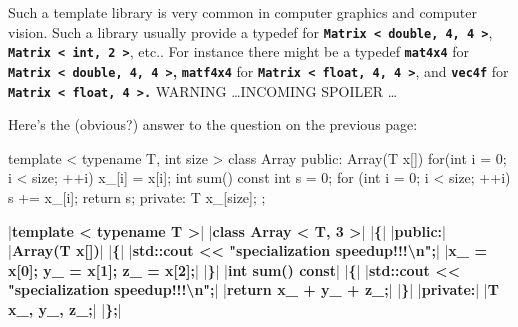 Such a template library is very common in computer graphics and computer
vision. Such a library usually provide a typedef for \texttt{\textbf{Matrix < double, 4, 4 >}}, \texttt{\textbf{Matrix < int, 2 >}}, etc.. For instance there might be a typedef \texttt{\textbf{mat4x4}} for \texttt{\textbf{Matrix < double, 4, 4 >}}\textbf{, }\texttt{\textbf{mat}\textbf{f}\textbf{4x4}} for \textbf{\texttt{Matrix < float, 4, 4 >}}, and \texttt{\textbf{vec4f}} for \texttt{\textbf{Matrix < float, 4 >.}}
\newpage %
WARNING \ldots INCOMING SPOILER \ldots

Here's the (obvious?) answer to the question on the previous page:

\begin{consolethree}[escapeinside=||]
template < typename T, int size >
class Array
{
public:
     Array(T x[])
     {    
          for(int i = 0; i  < size; ++i)
          x_[i] = x[i];
     }
     int sum() const
     {    
          int s = 0;
          for (int i = 0; i  < size; ++i)
              s += x_[i];
          return s;
     }
private:
     T x_[size];
};

|\textbf{template < typename T >}|
|\textbf{class Array < T, 3 >}|           
|\textbf{\{}|
|\textbf{public:}|
     |\textbf{Array(T x[])}|
     |\textbf{\{}|
          |\textbf{std::cout << "specialization speedup!!!\textbackslash n";}|
          |\textbf{x\_ = x[0]; y\_ = x[1]; z\_ = x[2];}|
     |\textbf{\}}|
     |\textbf{int sum() const}|
     |\textbf{\{}|
          |\textbf{std::cout << "specialization speedup!!!\textbackslash n";}|
          |\textbf{return x\_ + y\_ + z\_;}|
     |\textbf{\}}|
|\textbf{private:}|
     |\textbf{T x\_, y\_, z\_;}|
|\textbf{\};}|           
\end{consolethree}
